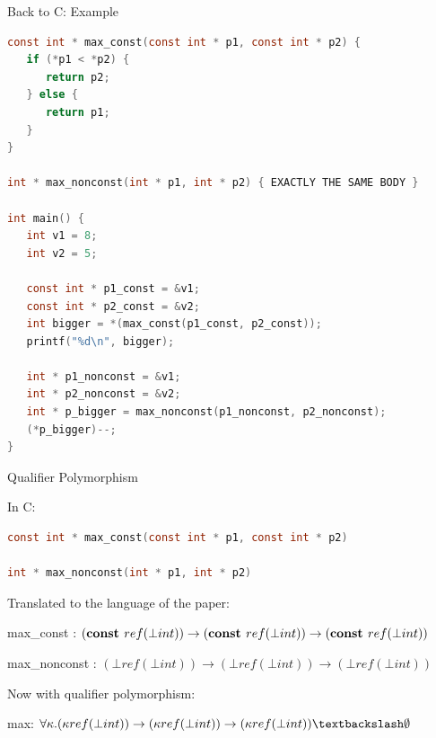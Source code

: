 \documentclass{beamer}
\begin{document}
\begin{frame}[fragile]{Back to C: Example}

\begin{scriptsize}
\begin{lstlisting}[language=C,frame=none,belowskip=- \medskipamount]
const int * max_const(const int * p1, const int * p2) {
   if (*p1 < *p2) {
      return p2;
   } else {
      return p1;
   }
}

int * max_nonconst(int * p1, int * p2) { EXACTLY THE SAME BODY }

int main() {
   int v1 = 8;
   int v2 = 5;

   const int * p1_const = &v1;
   const int * p2_const = &v2;
   int bigger = *(max_const(p1_const, p2_const));
   printf("%d\n", bigger);
   
   int * p1_nonconst = &v1;
   int * p2_nonconst = &v2;
   int * p_bigger = max_nonconst(p1_nonconst, p2_nonconst);
   (*p_bigger)--;
}
\end{lstlisting}
\end{scriptsize}

\end{frame}

\begin{frame}[fragile]{Qualifier Polymorphism}

In C:

\begin{scriptsize}
\begin{lstlisting}[language=C,frame=none,belowskip=- \medskipamount]
const int * max_const(const int * p1, const int * p2)

int * max_nonconst(int * p1, int * p2)
\end{lstlisting}
\end{scriptsize}

\bigskip

Translated to the language of the paper:

\begin{scriptsize}
max\_const : $(\text{\textbf{const }} ref(\bot int)) \rightarrow (\text{\textbf{const }} ref(\bot int)) \rightarrow (\text{\textbf{const }} ref(\bot int))$

max\_nonconst : $(\bot ref(\bot int)) \rightarrow (\bot ref(\bot int)) \rightarrow (\bot ref(\bot int))$
\end{scriptsize}

\bigskip

Now with qualifier polymorphism:

\begin{scriptsize}
max: $\forall \kappa . (\kappa ref(\bot int)) \rightarrow (\kappa ref(\bot int)) \rightarrow (\kappa ref(\bot int)) \textbackslash \emptyset$
\end{scriptsize}

\end{frame}
\end{document}
